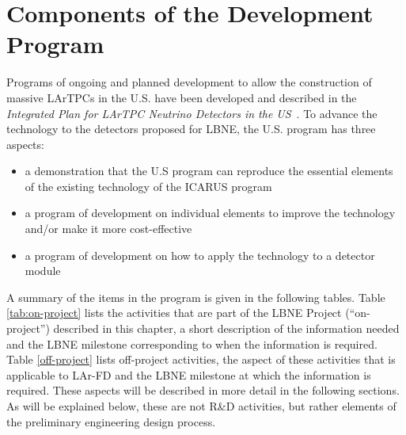 \section{Components of the Development Program}
\label{sec:comp-dev-prog}

Programs of ongoing and planned development to allow the construction of massive LArTPCs in the U.S. have been developed and described in the {\em Integrated Plan for LArTPC Neutrino Detectors in the US}~\cite{IP}.
To advance the technology to the detectors proposed for LBNE, the U.S. program has three aspects:
\begin{itemize}
  \item a demonstration that the U.S program can reproduce the essential elements of the existing technology of the ICARUS program 
  \item a program of development on individual elements to improve the technology and/or 
         make it more cost-effective
  \item a program of development on how to apply the technology to a detector module
 \end{itemize}
 
A summary of the items in the program is given in the following tables. Table \ref{tab:on-project} lists the activities that are part of the LBNE Project (``on-project'') described in this chapter, a short description of the information needed and the LBNE milestone corresponding to when the information is required. Table \ref{off-project} lists off-project activities, the aspect of these activities that is applicable to LAr-FD and the LBNE milestone at which the information is required. These aspects will be described in more detail in the following sections. As will be explained below, these are not R\&D activities, but rather elements of the preliminary engineering design process. 

